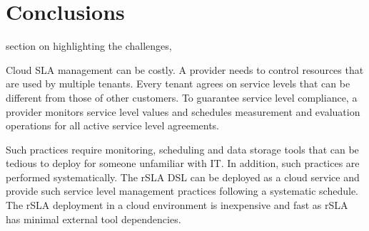 \section{Conclusions}

section on highlighting the challenges, 

Cloud SLA management can be costly. A provider needs to control resources that are used by multiple tenants. Every tenant agrees on service levels that can be different from those of other customers. To guarantee service level compliance, a provider monitors service level values and schedules measurement and evaluation operations for all active service level agreements. 

Such practices require monitoring, scheduling and data storage tools that can be tedious to deploy for someone unfamiliar with IT. In addition, such practices are performed systematically. The rSLA DSL can be deployed as a cloud service and provide such service level management practices following a systematic schedule. The rSLA deployment in a cloud environment is inexpensive and fast as rSLA has minimal external tool dependencies. 
